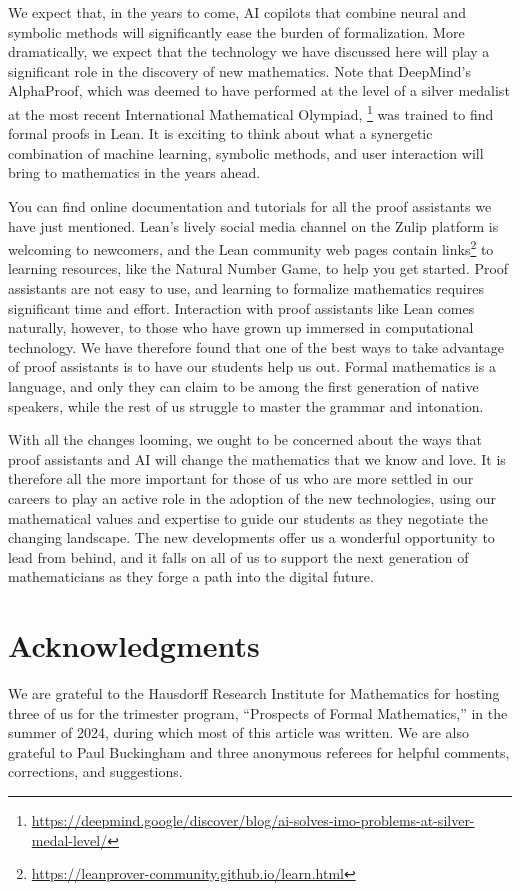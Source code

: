 \documentclass[11pt]{article}
\begin{document}
We expect that, in the years to come, AI copilots that combine neural and symbolic methods will significantly ease the burden of formalization.
More dramatically, we expect that the technology we have discussed here
will play a significant role in the discovery of new mathematics.
Note that DeepMind's AlphaProof, which was deemed to have performed at the level of a silver medalist at the most recent International Mathematical Olympiad,%
\footnote{\url{https://deepmind.google/discover/blog/ai-solves-imo-problems-at-silver-medal-level/}}
was trained to find formal proofs in Lean.
It is exciting to think about what a synergetic combination of machine learning, symbolic methods, and user interaction will bring to mathematics in the years ahead.

You can find online documentation and tutorials for all the proof assistants we have just mentioned.
Lean's lively social media channel on the Zulip platform is welcoming to newcomers,
and the Lean community web pages contain links\footnote{\url{https://leanprover-community.github.io/learn.html}} to learning resources, like the Natural
Number Game, to help you get started.
Proof assistants are not easy to use, and learning to formalize mathematics requires
significant time and effort.
Interaction with proof assistants like Lean comes naturally, however, to those who have grown up immersed in computational technology.
We have therefore found that one of the best ways to take advantage of proof assistants is to have our students help us out.
Formal mathematics is a language, and only they can claim to be among the first generation of native speakers, while the rest of us struggle to master the grammar and intonation.

With all the changes looming, we ought to be concerned about the ways that proof assistants and AI will change the mathematics that we know and love.
It is therefore all the more important for those of us who are more settled in our careers to play an active role in the adoption of the new technologies, using our mathematical values and expertise to guide our students as they negotiate the changing landscape.
The new developments offer us a wonderful opportunity to lead from behind, and it falls on all of us to support the next generation of mathematicians as they forge a path into the digital future.

\section*{Acknowledgments}

We are grateful to the Hausdorff Research Institute for Mathematics for hosting three
of us for the trimester program, ``Prospects of Formal Mathematics,'' in the summer of
2024, during which most of this article was written.
We are also grateful to Paul Buckingham and three anonymous referees for helpful comments,
corrections, and suggestions.

%

\end{document}
